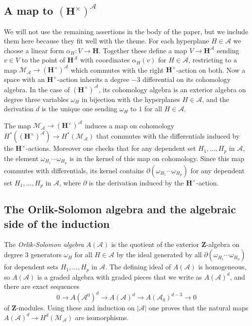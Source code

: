 \documentclass[11pt, reqno]{amsart}
\numberwithin{equation}{section}
\theoremstyle{definition}
\theoremstyle{plain}
\newcommand{\HH}{\mathbf{H}}
\newcommand{\ZZ}{\mathbf{Z}}
\newcommand{\A}{\mathcal{A}}
\newcommand{\cM}{\mathcal{M}}
\begin{document}
\subsection{A map to $(\HH^\times)^\A$} We will not use the remaining assertions in the body of the paper, but we include them here because they fit well with the theme. For each hyperplane $H \in \A$ we choose a linear form $\alpha_H:V \to \HH$. Together these define a map $V \to \HH^\A$ sending $v \in V$ to the point of $\HH^\A$ with coordinates $\alpha_H(v)$ for $H \in \A$, restricting to a map $\cM_\A \to (\HH^\times)^\A$ which commutes with the right $\HH^\times$-action on both. Now a space with an $\HH^\times$-action inherits a degree $-3$ differential on its cohomology algebra. In the case of $(\HH^\times)^\A$, its cohomology algebra is an exterior algebra on degree three variables $\omega_H$ in bijection with the hyperplanes $H \in \A$, and the derivation $d$ is the unique one sending $\omega_H$ to $1$ for all $H \in \A$.

The map $\cM_\A \to (\HH^\times)^\A$ induces a map on cohomology $H^*((\HH^\times)^\A) \to H^*(\cM_\A)$ that commutes with the differentials induced by the $\HH^\times$-actions.
 Moreover one checks that for any dependent set $H_1,\dots,H_p$ in $\A$, the element $\omega_{H_1} \cdots \omega_{H_p}$ is in the kernel of this map on cohomology. Since this map commutes with differentials, its kernel contains $\partial(\omega_{H_1} \cdots \omega_{H_p})$ for any dependent set $H_1,\dots,H_p$ in $\A$, where $\partial$ is the derivation induced by the $\HH^\times$-action. 
 

 
 
\subsection{The Orlik-Solomon algebra and the algebraic side of the induction} 

 The \emph{Orlik-Solomon algebra} $A(\A)$ is the quotient of the exterior $\ZZ$-algebra on degree $3$ generators $\omega_H$ for all $H \in \A$ by the ideal generated by all $\partial(\omega_{H_1} \cdots \omega_{H_p})$ for dependent sets $H_1,\dots,H_p$ in $\A$. The defining ideal of $A(\A)$ is homogeneous, so $A(\A)$ is a graded algebra with graded pieces that we write as $A(\A)^d$, and there are exact sequences
 $$0 \to A(\A^0)^d \to A(\A)^d \to A(\A_0)^{d-3} \to 0$$ of $\ZZ$-modules. Using these and induction on $|\A|$ one proves that the natural maps $A(\A)^d \to H^d(\cM_\A)$ are isomorphisms. 
\end{document}
